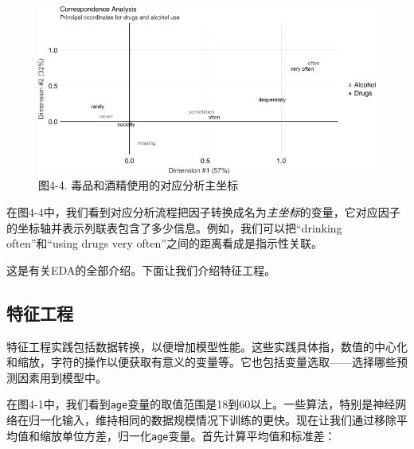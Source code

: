 \documentclass[
]{article}
\newenvironment{Shaded}{\begin{snugshade}}{\end{snugshade}}
\newcommand{\CommentTok}[1]{\textcolor[rgb]{0.56,0.35,0.01}{\textit{#1}}}
\newcommand{\DataTypeTok}[1]{\textcolor[rgb]{0.13,0.29,0.53}{#1}}
\newcommand{\DecValTok}[1]{\textcolor[rgb]{0.00,0.00,0.81}{#1}}
\newcommand{\ErrorTok}[1]{\textcolor[rgb]{0.64,0.00,0.00}{\textbf{#1}}}
\newcommand{\FloatTok}[1]{\textcolor[rgb]{0.00,0.00,0.81}{#1}}
\newcommand{\KeywordTok}[1]{\textcolor[rgb]{0.13,0.29,0.53}{\textbf{#1}}}
\newcommand{\NormalTok}[1]{#1}
\newcommand{\OperatorTok}[1]{\textcolor[rgb]{0.81,0.36,0.00}{\textbf{#1}}}
\newcommand{\StringTok}[1]{\textcolor[rgb]{0.31,0.60,0.02}{#1}}
\begin{document}
\begin{figure}
\centering
\includegraphics{figures/4_4.png}
\caption{图4-4. 毒品和酒精使用的对应分析主坐标}
\end{figure}

在图4-4中，我们看到对应分析流程把因子转换成名为\emph{主坐标}的变量，它对应因子的坐标轴并表示列联表包含了多少信息。例如，我们可以把``drinking
often''和``using drugs very often''之间的距离看成是指示性关联。

这是有关EDA的全部介绍。下面让我们介绍特征工程。

\hypertarget{ux7279ux5f81ux5de5ux7a0b}{%
\subsection{特征工程}\label{ux7279ux5f81ux5de5ux7a0b}}

特征工程实践包括数据转换，以便增加模型性能。这些实践具体指，数值的中心化和缩放，字符的操作以便获取有意义的变量等。它也包括变量选取------选择哪些预测因素用到模型中。

在图4-1中，我们看到\texttt{age}变量的取值范围是18到60以上。一些算法，特别是神经网络在归一化输入，维持相同的数据规模情况下训练的更快。现在让我们通过移除平均值和缩放单位方差，归一化\texttt{age}变量。首先计算平均值和标准差：

\begin{Shaded}
\end{Shaded}
\end{document}
